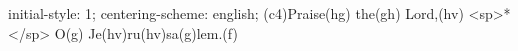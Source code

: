 initial-style: 1;
centering-scheme: english;
(c4)Praise(hg) the(gh) Lord,(hv) <sp>*</sp> O(g) Je(hv)ru(hv)sa(g)lem.(f)
